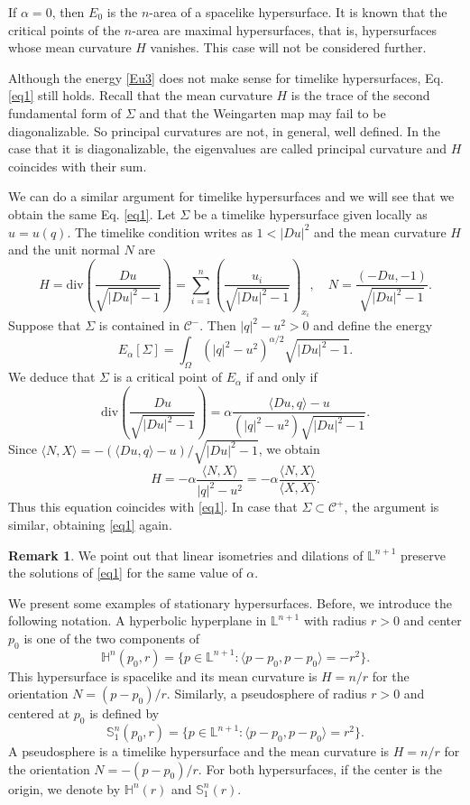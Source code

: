 \documentclass[a4paper,12pt]{amsart}
\theoremstyle{definition}
\newtheorem{remark}[theorem]{Remark}
\def\h{\mathbb H}
\def\l{\mathbb L}
\def\s{\mathbb S}
\begin{document}
If $\alpha=0$, then $E_0$ is the $n$-area of a spacelike hypersurface. It is known that the critical points of the $n$-area are maximal hypersurfaces, that is, hypersurfaces whose mean curvature $H$ vanishes. This case will not be considered further.

Although the energy \eqref{Eu3} does not make sense for timelike hypersurfaces, Eq. \eqref{eq1} still holds. Recall that the mean curvature $H$ is   the trace of the second fundamental form of $\Sigma$ and that  the Weingarten map may fail to be diagonalizable. So principal curvatures are not, in general, well defined. In the case that it is diagonalizable, the eigenvalues are called principal curvature and $H$ coincides with their sum. 



We can do  a similar argument for timelike hypersurfaces and we will see that we obtain the same Eq.  \ref{eq1}. Let  $\Sigma$ be a timelike hypersurface given locally as $u=u(q)$.  The timelike condition writes as $1<|Du|^2$ and the mean curvature $H$ and the unit normal $N$ are   
$$H=\mbox{div}\left(\frac{Du}{\sqrt{|Du|^2-1}}\right)=\sum_{i=1}^n\left(\frac{u_i}{\sqrt{|Du|^2-1}}\right)_{x_i},\quad N=\frac{(-Du,-1)}{\sqrt{|Du|^2-1}}.$$
Suppose that   $\Sigma$ is contained in   $\mathcal{C}^-$. Then $|q|^2-u^2>0$ and define  the energy 
$$E_\alpha[\Sigma]=\int_\Omega (|q|^2-u^2)^{\alpha/2}\sqrt{|Du|^2-1}.$$
We deduce that  $\Sigma$ is a critical point of $E_\alpha$ if and only if 
$$\mbox{div}\left(\frac{Du}{\sqrt{|Du|^2-1}}\right)=\alpha\frac{\langle Du,q\rangle-u}{(|q|^2-u^2)\sqrt{|Du|^2-1}}.$$
Since $\langle N,X\rangle=-(\langle Du,q\rangle-u)/\sqrt{|Du|^2-1}$, we obtain 
$$H=-\alpha\frac{\langle N,X\rangle}{|q|^2-u^2}=-\alpha\frac{\langle N,X\rangle}{\langle X,X\rangle}.$$
Thus this equation coincides with \eqref{eq1}. In case that $\Sigma\subset\mathcal{C}^+$, the argument is similar, obtaining \eqref{eq1} again.  


\begin{remark} We point out that   linear isometries and dilations of $\l^{n+1}$      preserve the solutions of \eqref{eq1} for the same value of $\alpha$. 
 \end{remark}

We present  some examples of stationary hypersurfaces. Before, we introduce the following notation. A hyperbolic hyperplane in $\l^{n+1}$ with radius $r>0$ and center $p_0$ is  one of the two components of
$$
\h^n(p_0,r)=\{ p \in \l^{n+1} : \langle p-p_0, p-p_0 \rangle =-r^2\}.
$$
This hypersurface is spacelike and its mean curvature is $H=n/r$ for the orientation $N=(p-p_0)/r$.
Similarly, a pseudosphere of radius $r>0$ and centered at $p_0$ is defined by 
$$
\s_1^n(p_0,r)=\{ p \in \l^{n+1} : \langle p-p_0, p-p_0 \rangle =r^2\}.
$$
A pseudosphere is a timelike hypersurface and the mean curvature is $H=n/r$  for the orientation $N=-(p-p_0)/r$. For both hypersurfaces, if the center is the origin, we denote by  $\h^n(r)$ and $\s_1^n(r)$.
\end{document}
